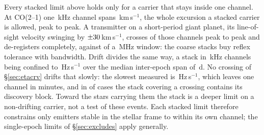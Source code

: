Every stacked limit above holds only for a carrier that stays inside one
channel. At CO(2--1) one \StkRefChanKHz\,kHz channel spans
\StkTolFineKms\,km\,s$^{-1}$, the whole excursion a stacked carrier is
allowed, peak to peak. A transmitter on a short-period giant planet, its
line-of-sight velocity swinging by
$\pm30$\,km\,s$^{-1}$, crosses \SzReflexPPChanFine{} of those
channels peak to peak and de-registers completely, against
\SzReflexPPChanCoarse{} of a \ChanBModeMHz\,MHz window: the coarse
stacks buy reflex tolerance with bandwidth. Drift divides the same way, a
stack in \StkRefChanKHz\,kHz channels being confined to
\StkDriftTolHzS\,Hz\,s$^{-1}$ over the median inter-epoch span of
\StkSpanMedD\,d. No crossing of \S\ref{sec:etacrv} drifts that slowly: the
slowest measured is \SttDriftMinHzS\,Hz\,s$^{-1}$, which leaves one channel in
\SttDriftMinMin{} minutes, and in \SttNIncDisc{} of \NUnattributed{} cases the
stack covering a crossing contains its discovery block. Toward the
\SttNHostStar{} stars carrying them the stack is a deeper limit on a
non-drifting carrier, not a test of these events. Each
stacked limit therefore constrains only emitters stable in the stellar frame to
within its own channel; the single-epoch limits of \S\ref{sec:excludes} apply
generally.
